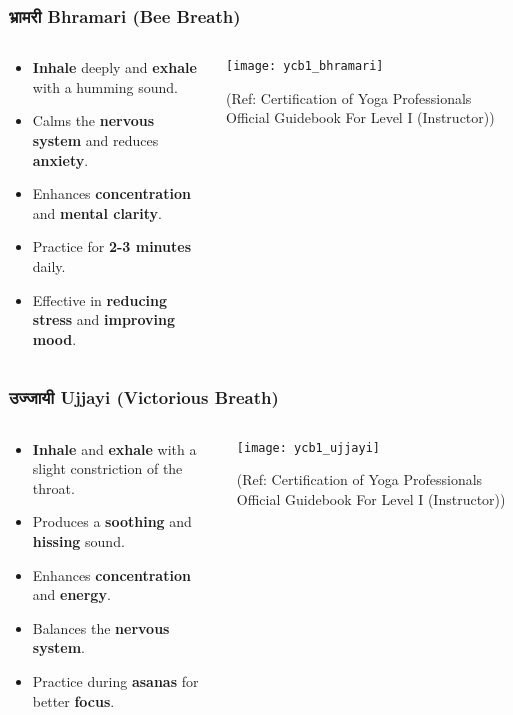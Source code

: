 \begin{frame}[fragile]\frametitle{भ्रामरी  Bhramari (Bee Breath)}
\begin{columns}
    \begin{column}[T]{0.5\linewidth}
      \begin{itemize}
        \item \textbf{Inhale} deeply and \textbf{exhale} with a humming sound.
        \item Calms the \textbf{nervous system} and reduces \textbf{anxiety}.
        \item Enhances \textbf{concentration} and \textbf{mental clarity}.
        \item Practice for \textbf{2-3 minutes} daily.
        \item Effective in \textbf{reducing stress} and \textbf{improving mood}.
      \end{itemize}
    \end{column}
    \begin{column}[T]{0.5\linewidth}
        \begin{center}
        \texttt{[image: ycb1\_bhramari]}
				
		{\tiny (Ref: Certification  of Yoga Professionals Official Guidebook For Level I (Instructor))}	 
        \end{center}	
    \end{column}
\end{columns}
\end{frame}

\begin{frame}[fragile]\frametitle{उज्जायी Ujjayi (Victorious Breath)}
\begin{columns}
    \begin{column}[T]{0.5\linewidth}
      \begin{itemize}
        \item \textbf{Inhale} and \textbf{exhale} with a slight constriction of the throat.
        \item Produces a \textbf{soothing} and \textbf{hissing} sound.
        \item Enhances \textbf{concentration} and \textbf{energy}.
        \item Balances the \textbf{nervous system}.
        \item Practice during \textbf{asanas} for better \textbf{focus}.
      \end{itemize}
    \end{column}
    \begin{column}[T]{0.5\linewidth}
        \begin{center}
        \texttt{[image: ycb1\_ujjayi]}
				
		{\tiny (Ref: Certification  of Yoga Professionals Official Guidebook For Level I (Instructor))}	 
        \end{center}	
    \end{column}
\end{columns}
\end{frame}

